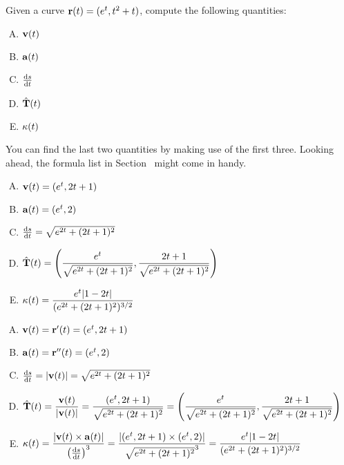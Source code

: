 \subsection*{\Procedural}
\begin{question}
Given a curve $\mathbf{r}(t)=(e^t,t^2+t)$, compute the following quantities:
\begin{enumerate}[A.]
\item $\mathbf{v}(t)$
\item $\mathbf{a}(t)$
\item $\diff{s}{t}$
\item $\hat{\mathbf{T}}(t)$
\item $\kappa(t)$
\end{enumerate}
\end{question}
\begin{hint}
You can find the last two quantities by making use of the first three. Looking ahead, the formula list in Section~ might come in handy. 
\end{hint}
\begin{answer}
\begin{enumerate}[A.]
\item $\mathbf{v}(t)=(e^t,2t+1)$
\item $\mathbf{a}(t)=(e^t,2)$
\item $\diff{s}{t}=\sqrt{e^{2t}+(2t+1)^2}$
\item $\displaystyle\hat{\mathbf{T}}(t)=\left(
 \frac{e^t}{\sqrt{e^{2t}+(2t+1)^2}},
 \frac{2t+1}{\sqrt{e^{2t}+(2t+1)^2}}
 \right)
$
\item $\displaystyle\kappa(t)=\dfrac{e^t|1-2t|}{(e^{2t}+(2t+1)^2)^{3/2}}$
\end{enumerate}

\end{answer}
\begin{solution}
\begin{enumerate}[A.]
\item $\mathbf{v}(t)=\mathbf{r}'(t)=(e^t,2t+1)$
\item $\mathbf{a}(t)=\mathbf{r}''(t)=(e^t,2)$
\item $\diff{s}{t}=|\vv(t)|=\sqrt{e^{2t}+(2t+1)^2}$
\item $\displaystyle\hat{\mathbf{T}}(t)=\frac{\mathbf{v}(t)}{|\mathbf{v}(t)|}=\frac{(e^t,2t+1)}{\sqrt{e^{2t}+(2t+1)^2}}=\left(
 \frac{e^t}{\sqrt{e^{2t}+(2t+1)^2}},
 \frac{2t+1}{\sqrt{e^{2t}+(2t+1)^2}}
 \right)
$
\item $\displaystyle\ka(t)=\frac{|\vv(t) \times \va(t)|}{\left(\diff{s}{t}\right)^3}=\frac{\left| (e^t,2t+1)\times(e^t,2)\right|}{\sqrt{e^{2t}+(2t+1)^2}^3}=\dfrac{e^t|1-2t|}{(e^{2t}+(2t+1)^2)^{3/2}}$
\end{enumerate}

\end{solution}

